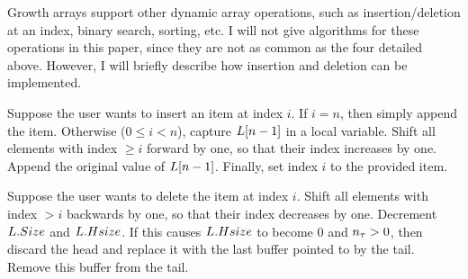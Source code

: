 Growth arrays support other dynamic array operations, such as insertion/deletion at an index, binary search, sorting, etc. I will not give algorithms for these operations in this paper, since they are not as common as the four detailed above. However, I will briefly describe how insertion and deletion can be implemented.

Suppose the user wants to insert an item at index $i$. If $i = n$, then simply append the item. Otherwise ($0 \leq i < n$), capture $L[n - 1]$ in a local variable. Shift all elements with index $\geq i$ forward by one, so that their index increases by one. Append the original value of $L[n - 1]$. Finally, set index $i$ to the provided item.

Suppose the user wants to delete the item at index $i$. Shift all elements with index $> i$ backwards by one, so that their index decreases by one. Decrement $L.Size$ and $L.Hsize$. If this causes $L.Hsize$ to become $0$ and $n_\tau > 0$, then discard the head and replace it with the last buffer pointed to by the tail. Remove this buffer from the tail.